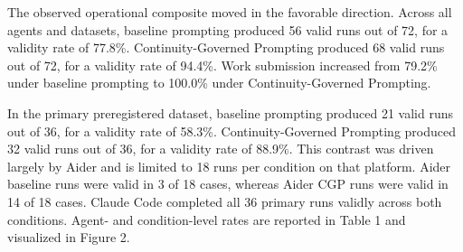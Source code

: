 \documentclass[11pt]{article}
\begin{document}
The observed operational composite moved in the favorable direction. Across all agents and datasets, baseline prompting produced 56 valid runs out of 72, for a validity rate of 77.8\%. Continuity-Governed Prompting produced 68 valid runs out of 72, for a validity rate of 94.4\%. Work submission increased from 79.2\% under baseline prompting to 100.0\% under Continuity-Governed Prompting.

In the primary preregistered dataset, baseline prompting produced 21 valid runs out of 36, for a validity rate of 58.3\%. Continuity-Governed Prompting produced 32 valid runs out of 36, for a validity rate of 88.9\%. This contrast was driven largely by Aider and is limited to 18 runs per condition on that platform. Aider baseline runs were valid in 3 of 18 cases, whereas Aider CGP runs were valid in 14 of 18 cases. Claude Code completed all 36 primary runs validly across both conditions. Agent- and condition-level rates are reported in Table 1 and visualized in Figure 2.

\begin{table}[H]
\centering
\small
{}
\caption{Summary by dataset, agent, and condition.}
\label{tab:summary}
\end{table}
\end{document}
